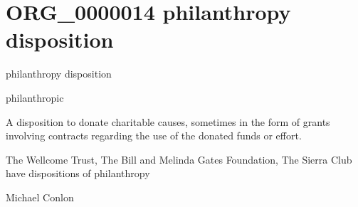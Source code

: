 \documentclass[letterpaper,10pt,english]{sphinxmanual}
\begin{document}
\section{ORG\_0000014 \sphinxhyphen{} philanthropy disposition}
\label{\detokenize{doc-ORG_0000014:org-0000014-philanthropy-disposition}}\label{\detokenize{doc-ORG_0000014:index-0}}\label{\detokenize{doc-ORG_0000014::doc}}
\begin{sphinxShadowBox}

\sphinxAtStartPar
philanthropy disposition
\end{sphinxShadowBox}

\begin{sphinxShadowBox}

\sphinxAtStartPar
philanthropic
\end{sphinxShadowBox}

\begin{sphinxShadowBox}

\sphinxAtStartPar
A disposition to donate charitable causes, sometimes in the form of grants involving contracts regarding the use of the donated funds or effort.
\end{sphinxShadowBox}

\begin{sphinxShadowBox}

\sphinxAtStartPar
{}
\end{sphinxShadowBox}

\begin{sphinxShadowBox}

\sphinxAtStartPar
The Wellcome Trust, The Bill and Melinda Gates Foundation, The Sierra Club have dispositions of philanthropy
\end{sphinxShadowBox}

\begin{sphinxShadowBox}

\sphinxAtStartPar
Michael Conlon 
\end{sphinxShadowBox}
\begin{quote}
\label{\detokenize{doc-ORG_0000015:org-0000015}}\label{\detokenize{doc-ORG_0000015:funding-disposition}}\label{\detokenize{doc-ORG_0000015:org-0000015}}
\ignorespaces \end{quote}
\end{document}

